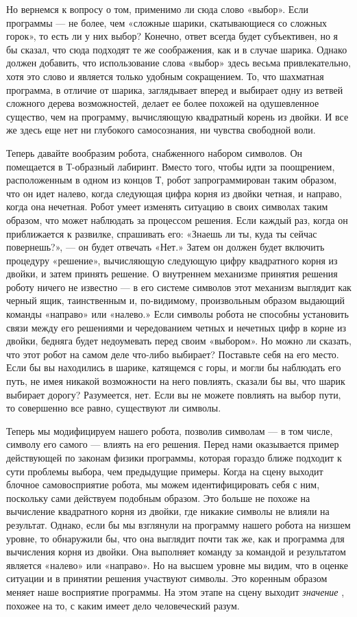 Но вернемся к вопросу о том, применимо ли сюда слово «выбор». Если программы --- не более, чем «сложные шарики, скатывающиеся со сложных горок», то есть ли у них выбор? Конечно, ответ всегда будет субъективен, но я бы сказал, что сюда подходят те же соображения, как и в случае шарика. Однако должен добавить, что использование слова «выбор» здесь весьма привлекательно, хотя это слово и является только удобным сокращением. То, что шахматная программа, в отличие от шарика, заглядывает вперед и выбирает одну из ветвей сложного дерева возможностей, делает ее более похожей на одушевленное существо, чем на программу, вычисляющую квадратный корень из двойки. И все же здесь еще нет ни глубокого самосознания, ни чувства свободной воли.

Теперь давайте вообразим робота, снабженного набором символов. Он помещается в Т-образный лабиринт. Вместо того, чтобы идти за поощрением, расположенным в одном из концов Т, робот запрограммирован таким образом, что он идет налево, когда следующая цифра корня из двойки четная, и направо, когда она нечетная. Робот умеет изменять ситуацию в своих символах таким образом, что может наблюдать за процессом решения. Если каждый раз, когда он приближается к развилке, спрашивать его: «Знаешь ли ты, куда ты сейчас повернешь?», --- он будет отвечать «Нет.» Затем он должен будет включить процедуру «решение», вычисляющую следующую цифру квадратного корня из двойки, и затем принять решение. О внутреннем механизме принятия решения роботу ничего не известно --- в его системе символов этот механизм выглядит как черный ящик, таинственным и, по-видимому, произвольным образом выдающий команды «направо» или «налево.» Если символы робота не способны установить связи между его решениями и чередованием четных и нечетных цифр в корне из двойки, бедняга будет недоумевать перед своим «выбором». Но можно ли сказать, что этот робот на самом деле что-либо выбирает? Поставьте себя на его место. Если бы вы находились в шарике, катящемся с горы, и могли бы наблюдать его путь, не имея никакой возможности на него повлиять, сказали бы вы, что шарик выбирает дорогу? Разумеется, нет. Если вы не можете повлиять на выбор пути, то совершенно все равно, существуют ли символы.

Теперь мы модифицируем нашего робота, позволив символам --- в том числе, символу его самого --- влиять на его решения. Перед нами оказывается пример действующей по законам физики программы, которая гораздо ближе подходит к сути проблемы выбора, чем предыдущие примеры. Когда на сцену выходит блочное самовосприятие робота, мы можем идентифицировать себя с ним, поскольку сами действуем подобным образом. Это больше не похоже на вычисление квадратного корня из двойки, где никакие символы не влияли на результат. Однако, если бы мы взглянули на программу нашего робота на низшем уровне, то обнаружили бы, что она выглядит почти так же, как и программа для вычисления корня из двойки. Она выполняет команду за командой и результатом является «налево» или «направо». Но на высшем уровне мы видим, что в оценке ситуации и в принятии решения участвуют символы. Это коренным образом меняет наше восприятие программы. На этом этапе на сцену выходит \emph{значение} , похожее на то, с каким имеет дело человеческий разум.

